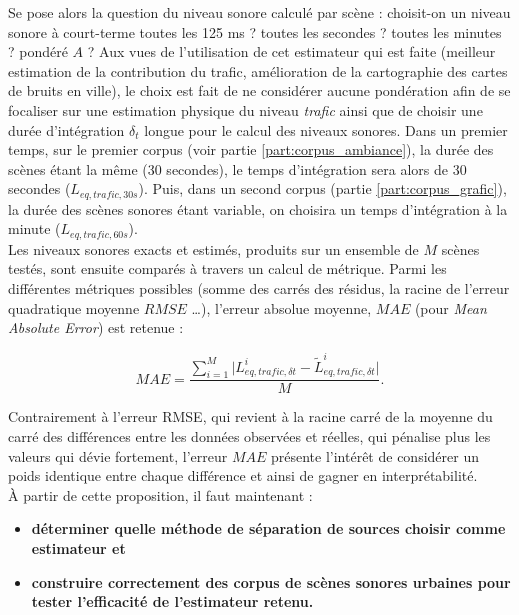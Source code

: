 Se pose alors la question du niveau sonore calculé par scène : choisit-on un niveau sonore à court-terme toutes les 125 ms ? toutes les secondes ? toutes les minutes ? pondéré $A$ ? Aux vues de l'utilisation de cet estimateur qui est faite (meilleur estimation de la contribution du trafic, amélioration de la cartographie des cartes de bruits en ville), le choix est fait de ne considérer aucune pondération afin de se focaliser sur une estimation physique du niveau \textit{trafic} ainsi que de choisir une durée d'intégration $\delta_t$ longue pour le calcul des niveaux sonores. 
Dans un premier temps, sur le premier corpus (voir partie \ref{part:corpus_ambiance}), la durée des scènes étant la même (30 secondes), le temps d'intégration sera alors de 30 secondes ($L_{eq,trafic,30s}$). Puis, dans un second corpus (partie \ref{part:corpus_grafic}), la durée des scènes sonores étant variable, on choisira un temps d'intégration à la minute ($L_{eq,trafic,60s}$).\\

Les niveaux sonores exacts et estimés, produits sur un ensemble de $M$ scènes testés, sont ensuite comparés à travers un calcul de métrique. Parmi les différentes métriques possibles (somme des carrés des résidus, la racine de l'erreur quadratique moyenne $RMSE$ \dots), l'erreur absolue moyenne, $MAE$ (pour \textit{Mean Absolute Error}) est retenue :

\begin{equation}
MAE = \frac{\sum_{i = 1}^{M} \vert L_{eq, trafic, \delta t}^i - \tilde{L}_{eq, trafic, \delta t}^i \vert}{M}.
\end{equation}

Contrairement à l'erreur RMSE, qui revient à la racine carré de la moyenne du carré des différences entre les données observées et réelles, qui pénalise plus les valeurs qui dévie fortement, l'erreur $MAE$ présente l'intérêt de considérer un poids identique entre chaque différence et ainsi de gagner en interprétabilité.\\

À partir de cette proposition, il faut maintenant : 
\begin{itemize}
\item \textbf{déterminer quelle méthode de séparation de sources choisir comme estimateur et}
\item \textbf{construire correctement des corpus de scènes sonores urbaines pour tester l'efficacité de l'estimateur retenu.}
\end{itemize}



%

%
%
%
